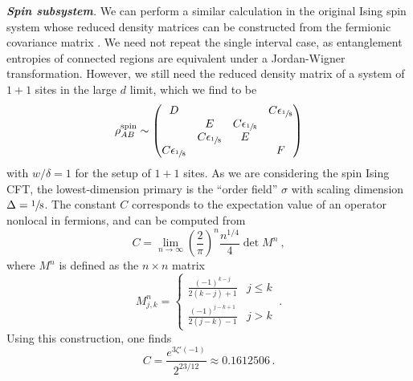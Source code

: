 \documentclass[prl,a4paper,notitlepage,twocolumn,superscriptaddress,longbibliography,reprint]{revtex4-2}
\newcommand{\mysection}[1]{{\vspace{10 pt}\noindent \emph{{\textbf{#1}}.}}}
\begin{document}
\mysection{Spin subsystem} We can perform a similar calculation in the original Ising spin system whose reduced density matrices can be constructed from the fermionic covariance matrix \cite{Coser:2015mta}. We need not repeat the single interval case, as entanglement entropies of connected regions are equivalent under a Jordan-Wigner transformation. However, we still need the reduced density matrix of a system of $1+1$ sites in the large $d$ limit, which we find to be
\begin{equation}
\label{eq:rhoAB}
    \rho^{\mathrm{spin}}_{AB} \sim 
    \begin{pmatrix}
      D &  &  & C\epsilon_{\sfrac{1}{8}} \\
  & E & C\epsilon_{\sfrac{1}{8}} & \\
  & C\epsilon_{\sfrac{1}{8}} & E &  \\
 C\epsilon_{\sfrac{1}{8}} &  &  & F
    \end{pmatrix}
\end{equation}
with $w/\delta=1$ for the setup of $1+1$ sites. As we are considering the spin Ising CFT, the lowest-dimension primary is the ``order field'' $\sigma$ with scaling dimension $\Delta=\sfrac{1}{8}$. 
The constant $C$ corresponds to the expectation value of an operator nonlocal in fermions, and can be computed from
\begin{equation}
    C = \lim_{n \to \infty} \left( \frac{2}{\pi} \right)^n \frac{n^{1/4}}{4} \det{M^n} \ ,
\end{equation}
where $M^n$ is defined as the $n \times n$ matrix
\begin{equation}
    M^n_{j,k} = 
    \begin{cases}
    \frac{(-1)^{k-j}}{2(k-j)+1} & j \leq k \\
    \frac{(-1)^{j-k+1}}{2(j-k)-1} & j > k
    \end{cases} \ .
\end{equation}
Using this construction, one finds~\cite{McCoy:2010}
\begin{equation}
\label{eq:Cdefinition}
    C =\frac{e^{3\zeta'(-1)}}{2^{23/12}}\approx 0.1612506\,.
\end{equation}
\end{document}
